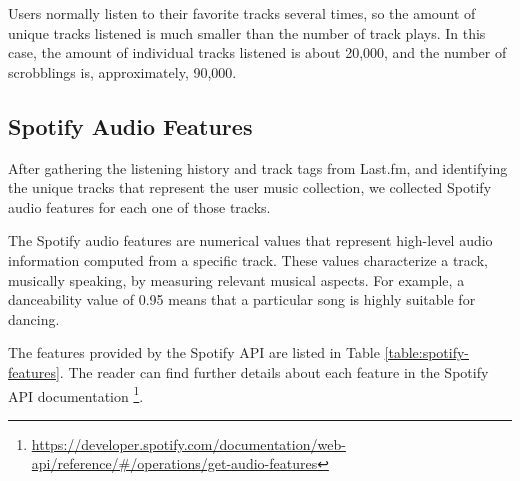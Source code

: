 \documentclass[sn-mathphys]{sn-jnl}%
\theoremstyle{thmstyleone}%
\theoremstyle{thmstyletwo}%
\theoremstyle{thmstylethree}%
\begin{document}
Users normally listen to their favorite tracks several times,
so the amount of unique tracks listened is much smaller
than the number of track plays. In this case, the amount of
individual tracks listened is about 20,000, and the number of scrobblings is, approximately, 90,000.


\subsection{Spotify Audio Features}

After gathering the listening history and track tags from Last.fm, and identifying the unique
tracks that represent the user music collection, we
collected Spotify audio features for each one of those tracks.

The Spotify audio features are numerical values that represent high-level audio information computed from a specific
track. These values characterize a track, musically speaking,
by measuring relevant musical aspects.
For example, a danceability value of 0.95 means
that a particular song is highly suitable for dancing.

The features provided by the Spotify API are listed in
Table \ref{table:spotify-features}.
The reader can find further details about each feature in the Spotify API documentation
\footnote[5]{
      \url{https://developer.spotify.com/documentation/web-api/reference/\#/operations/get-audio-features}
}.
\end{document}
